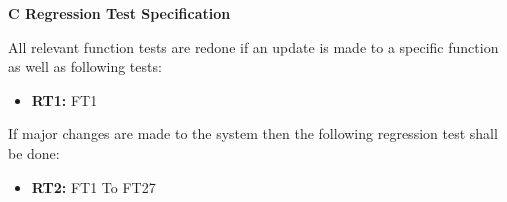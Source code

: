 \documentclass{article}
\begin{document}
		\newpage
		\begin{flushleft}
		{\large \textbf{C Regression Test Specification}}
		\end{flushleft}
			
		\begin{flushleft}
		All relevant function tests are redone if an update is made to a specific function as well as following tests:
		\end{flushleft}
		
		\begin{itemize}
		
  			\item \textbf{RT1:} FT1
  			
			  					
		\end{itemize}
		
		\begin{flushleft}
			If major changes are made to the system then the following regression test shall be done:
			\end{flushleft}	
		
		\begin{itemize}			
  			
  			\item \textbf{RT2:} FT1 To FT27			

		\end{itemize}
		
		
			
		


\end{document}
